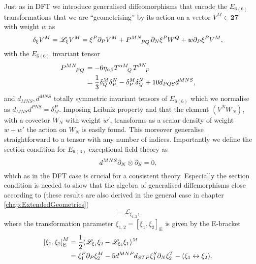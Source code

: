 Just as in DFT we introduce generalised diffeomorphisms that encode the $E_{6(6)}$ transformations that we are ``geometrising'' by its action on a vector $V^M\in\mathbf{27}$ with weight $w$ as 
\begin{equation}
    \delta_\xi V^M = \mathscr{L}_\xi V^M = \xi^P\pd_PV^M+\tensor{P}{^{MN}_{PQ}}\pd_N\xi^P W^Q+w\pd_P\xi^PV^M,
\end{equation}
with the $E_{6(6)}$ invariant tensor
\begin{equation}
    \begin{aligned}
    \tensor{P}{^{MN}_{PQ}} &= -6\eta_{\alpha\beta}\tensor{T}{^{\alpha M}_Q}\tensor{T}{^{\beta N}_P} \\
    &= \frac{1}{3}\delta^M_Q\delta^N_P-\delta^M_P\delta^N_Q+10d_{PQS}d^{MNS},
    \end{aligned}
\end{equation}
and $d_{MNS},d^{MNS}$ totally symmetric invariant tensors of $E_{6(6)}$ which we normalise as $d_{MNS}d^{PNS}=\delta^P_M$. Imposing Leibniz property and that the element $(V^NW_N)$, with a covector $W_N$ with weight $w'$, transforms as a scalar density of weight $w+w'$ the action on $W_N$ is easily found. This moreover generalise straightforward to a tensor with any number of indices. Importantly we define the section condition for $E_{6(6)}$ exceptional field theory as 
\begin{equation}
    d^{MNS}\partial_N\otimes\partial_S = 0,
\end{equation}
which as in the DFT case is crucial for a consistent theory. Especially the section condition is needed to show that the algebra of generalised diffemorphisms close according to \cite{E62014} (these results are also derived in the general case in chapter \ref{chap:ExtendedGeometries})
\begin{equation}
    [\mathscr{L}_{\xi_1},\mathscr{L}_{\xi_2}] = \mathscr{L}_{\xi_{1,2}},
\end{equation}
where the transformation parameter $\xi_{1,2}=[\xi_1,\xi_2]_{\text{E}}$ is given by the E-bracket 
\begin{equation}\begin{aligned}
    \left[\xi_1,\xi_2\right]_{\text{E}}^M &= \frac{1}{2}(\mathscr{L}_{\xi_1}\xi_2-\mathscr{L}_{\xi_2}\xi_1)^M\\ &=\xi_1^P\partial_P\xi_2^M-5d^{MNP}d_{STP}\xi_1^S\partial_N\xi_2^T-(\xi_1\leftrightarrow\xi_2).
    \end{aligned}
\end{equation}

